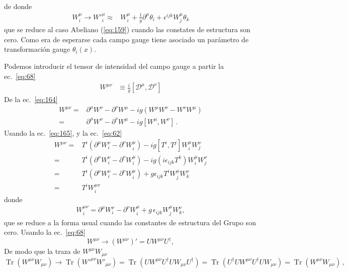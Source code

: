 de donde
\begin{align}
  \label{eq:170}
  W^\mu_i\to {W'}^\mu_i\approx&W^\mu_i+\frac{1}{g}\partial^\mu\theta_i+\epsilon^{ijk}W^\mu_j\theta_k
\end{align}
que se reduce al caso Abeliano (\ref{eq:159}) cuando las constates de estructura son cero. Como era de esperarse cada campo gauge tiene asociado un par\'ametro de transformaci\'on gauge $\theta_i(x)$.

Podemos introducir el tensor de intensidad del campo gauge a partir la ec.~\eqref{eq:68}
\begin{align}
  \label{eq:126}
  W^{\mu\nu}&\equiv\frac{i}{g}[\mathcal{D}^\mu,\mathcal{D}^\nu]
 \end{align}
De la ec.~\eqref{eq:164}
\begin{align}
    W^{\mu\nu}=&\partial^\mu W^\nu-\partial^\nu W^\mu-ig(W^\mu W^\nu-W^\nu W^\mu)\nonumber\\
    =&\partial^\mu W^\nu-\partial^\nu W^\mu-ig[W^\mu, W^\nu]\,.
\end{align}
Usando la ec.~\eqref{eq:165}, y la ec.~\eqref{eq:62}
\begin{align}
  W^{\mu\nu}=&T^i(\partial^\mu W^\nu_i-\partial^\nu W^\mu_i)-ig\left[T^i,T^j\right]W^\mu_iW^\nu_j\nonumber\\
  =&T^i(\partial^\mu W^\nu_i-\partial^\nu W^\mu_i)-ig\left(i\epsilon_{ijk}T^k\right)W^\mu_iW^\nu_j\nonumber\\
  =&T^i(\partial^\mu W^\nu_i-\partial^\nu W^\mu_i)+g\epsilon_{ijk}T^iW^\mu_jW^\nu_k\nonumber\\
  =&T^iW^{\mu\nu}_i
\end{align}
donde
\begin{align}
  \label{eq:124}
  W^{\mu\nu}_i=\partial^\mu W^\nu_i -\partial^\nu W^\mu_i+g\,\epsilon_{ijk}W^\mu_j W^\nu_k,
\end{align}
que se reduce a la forma usual cuando las constantes de estructura del Grupo son cero.
Usando la ec.~\eqref{eq:68}
\begin{equation}
  \label{eq:180}
   W^{\mu\nu}\to\left(
    W^{\mu\nu}
  \right)'=UW^{\mu\nu}U^\dagger,
 \end{equation}
De modo que la traza de $W^{\mu\nu}W_{\mu\nu}$ 
\begin{equation}
\operatorname{Tr}(W^{\mu\nu}W_{\mu\nu})\to \operatorname{Tr}({W'}^{\mu\nu}W'_{\mu\nu})
=\operatorname{Tr}(UW^{\mu\nu}U^\dagger UW_{\mu\nu}U^\dagger)=\operatorname{Tr}(U^\dagger UW^{\mu\nu}U^\dagger UW_{\mu\nu})
=\operatorname{Tr}(W^{\mu\nu}W_{\mu\nu})\,,
\end{equation}
